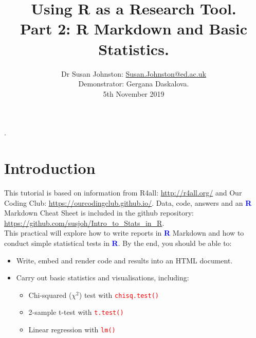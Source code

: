 \documentclass[a4paper,12pt]{article}
\newcommand\boldblue[1]{\textcolor{blue}{\textbf{#1}}}
\newcommand\code[1]{\textcolor{red}{\texttt{#1}}}
\begin{document}





\title{Using R as a Research Tool.\\
Part 2: R Markdown and Basic Statistics.}

\author{\small{Dr Susan Johnston: \href{mailto:Susan.Johnston@ed.ac.uk}{Susan.Johnston@ed.ac.uk}}  \\
        \small{Demonstrator: Gergana Daskalova.} \\
        \small{5th November 2019}}
\date{}



\maketitle


\vspace*{-2.5cm}.
\section {Introduction}

This tutorial is based on information from R4all: \url{http://r4all.org/} and Our Coding Club: \url{https://ourcodingclub.github.io/}. Data, code, answers and an \boldblue{R} Markdown Cheat Sheet is included in the github repository: \url{https://github.com/susjoh/Intro_to_Stats_in_R}. \\

This practical will explore how to write reports in \boldblue{R} Markdown and how to conduct simple statistical tests in \boldblue{R}. By the end, you should be able to:

\begin{itemize}

\item Write, embed and render code and results into an HTML document.

\item Carry out basic statistics and visualisations, including:

\begin{itemize}

\item Chi-squared ($\chi^{2}$) test with \code{chisq.test()}
\item 2-sample t-test with \code{t.test()}
\item Linear regression with \code{lm()}

\end{itemize}

\end{itemize}
\end{document}
